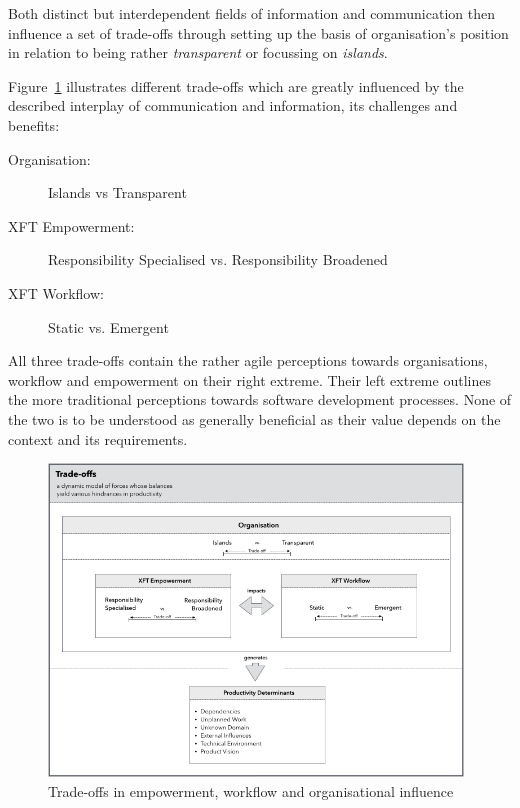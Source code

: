 Both distinct but interdependent fields of information and communication then influence a set of trade-offs through setting up the basis of organisation's position in relation to being rather \emph{transparent} or focussing on \emph{islands}.

Figure~\ref{fig:trade-offs} illustrates different trade-offs which are greatly influenced by the described interplay of communication and information, its challenges and benefits:

\begin{description}
   \item[Organisation:] Islands vs Transparent
   \item[XFT Empowerment:] Responsibility Specialised vs. Responsibility Broadened
   \item[XFT Workflow:] Static vs. Emergent
\end{description}

All three trade-offs contain the rather agile perceptions towards organisations, workflow and empowerment on their right extreme. Their left extreme outlines the more traditional perceptions towards software development processes. None of the two is to be understood as generally beneficial as their value depends on the context and its requirements.

\begin{figure}[h!]
  \centering
  \includegraphics[width=0.98\textwidth]{figures/tradeoffs.png}
  \caption{Trade-offs in empowerment, workflow and organisational influence}
  \label{fig:trade-offs}
\end{figure}

